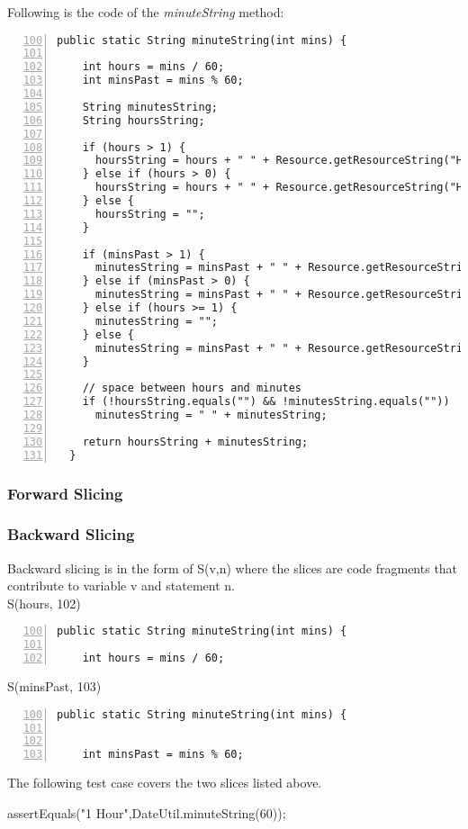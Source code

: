 \documentclass[fontsize=12pt,paper=letter,twoside]{scrartcl}
\begin{document}
\noindent Following is the code of the \emph{minuteString} method:
\begin{lstlisting}[numbers=left,firstnumber=100]
  public static String minuteString(int mins) {
    
    int hours = mins / 60;
    int minsPast = mins % 60;
    
    String minutesString;
    String hoursString;
    
    if (hours > 1) {
      hoursString = hours + " " + Resource.getResourceString("Hours");
    } else if (hours > 0) {
      hoursString = hours + " " + Resource.getResourceString("Hour");
    } else {
      hoursString = "";
    }

    if (minsPast > 1) {
      minutesString = minsPast + " " + Resource.getResourceString("Minutes");
    } else if (minsPast > 0) {
      minutesString = minsPast + " " + Resource.getResourceString("Minute");
    } else if (hours >= 1) {
      minutesString = "";
    } else {
      minutesString = minsPast + " " + Resource.getResourceString("Minutes");
    }

    // space between hours and minutes
    if (!hoursString.equals("") && !minutesString.equals(""))
      minutesString = " " + minutesString;

    return hoursString + minutesString;
  }
\end{lstlisting}

\subsubsection{Forward Slicing}


\subsubsection{Backward Slicing}
Backward slicing is in the form of S(v,n) where the slices are code fragments that contribute to variable v and statement n.\\

S(hours, 102)
\begin{lstlisting}[numbers=left,firstnumber=100]
  public static String minuteString(int mins) {
    
    int hours = mins / 60;
\end{lstlisting}  


S(minsPast, 103)
\begin{lstlisting}[numbers=left,firstnumber=100]
  public static String minuteString(int mins) {
    
    
    int minsPast = mins % 60;
\end{lstlisting} 
The following test case covers the two slices listed above.
\begin{code}
  assertEquals("1 Hour",DateUtil.minuteString(60));
\end{code}
\end{document}
